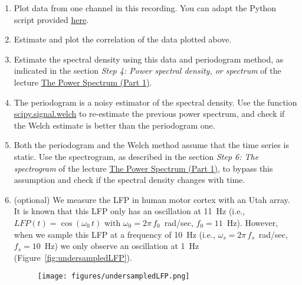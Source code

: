 \documentclass[12pt]{article}
\begin{document}
\begin{enumerate}

    \item Plot data from one channel in this recording. You can adapt the
        Python script provided \href{}{here}.

    \item Estimate and plot the correlation of the data plotted above.

    \item Estimate the spectral density using this data and periodogram method,
        as indicated in the section \emph{Step 4: Power spectral density, or
        spectrum} of the lecture
        \href{https://mark-kramer.github.io/Case-Studies-Python/03.html#step-4-power-spectral-density-or-spectrum}{The Power Spectrum (Part 1)}.

    \item The periodogram is a noisy estimator of the spectral
        density. Use the function
        \href{https://docs.scipy.org/doc/scipy/reference/generated/scipy.signal.welch.html#scipy.signal.welch}{scipy.signal.welch} to re-estimate
        the previous power spectrum, and check if the Welch estimate is better
        than the periodogram one.

    \item Both the periodogram and the Welch method assume that the time
        series is static. Use the spectrogram, as described in the section
        \emph{Step 6: The spectrogram} of the lecture
        \href{https://hub.2i2c.mybinder.org/user/mark-kramer-case-studies-python-vd53gjx8/notebooks/03.ipynb#the-spectrogram}{The
        Power Spectrum (Part 1)}, to bypass this assumption and check if the
        spectral density changes with time.

    \item (optional) We measure the LFP in human motor cortex with an Utah array. It is
        known that this LFP only has an oscillation at 11~Hz (i.e.,
        $LFP(t)=\cos(\omega_0\,t)$ with $\omega_0=2\pi\,f_0$~rad/sec,
        $f_0=11$~Hz). However, when we sample this LFP at a frequency of 10~Hz
        (i.e., $\omega_s=2\pi\,f_s$~rad/sec, $f_s=10$~Hz) we only observe an
        oscillation at 1~Hz (Figure~\ref{fig:undersampledLFP}).

        \begin{figure}
            \begin{center}
                \texttt{[image: figures/undersampledLFP.png]}


\end{center}
\end{figure}
\end{enumerate}
\end{document}
